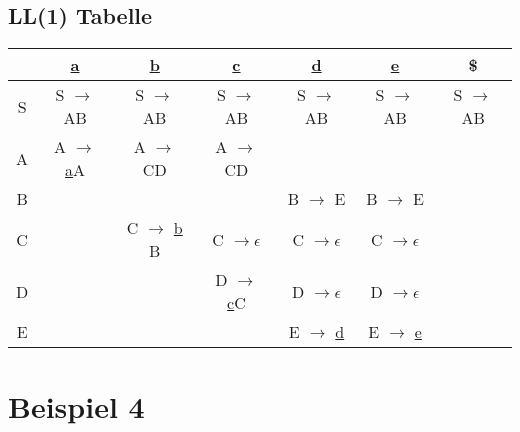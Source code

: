 \documentclass[12pt,runningheads,a4paper]{llncs}
\begin{document}
\newpage
\subsection*{LL(1) Tabelle}

\begin{table}[htbp]
    \centering
      \begin{tabular}{|c|c|c|c|c|c|c|}
\hline
   & \underline{a} & \underline{b} & \underline{c} & \underline{d} & \underline{e} & \$ \\ \hline
S & S $\rightarrow$ AB & S $\rightarrow$ AB & S $\rightarrow$ AB&  S $\rightarrow$ AB  &  S $\rightarrow$ AB &  S $\rightarrow$ AB \\ \hline
A & A $\rightarrow$ \underline{a}A & A $\rightarrow$ CD & A $\rightarrow$ CD &   &  &  \\ \hline
B &  &   &   & B $\rightarrow$ E &B $\rightarrow$ E  &   \\ \hline
C  &  & C $\rightarrow$ \underline{b} B & C $\rightarrow \epsilon$ &C $\rightarrow \epsilon$   & C $\rightarrow \epsilon$ & \\ \hline
D &  &   &D $\rightarrow$ \underline{c}C   &D $\rightarrow \epsilon$   &D $\rightarrow \epsilon$  &   \\ \hline
E &  &   & &E $\rightarrow$ \underline{d}   &E $\rightarrow$ \underline{e}  &   \\
\hline
        \end{tabular}
\end{table}

\section*{Beispiel 4}
\end{document}
